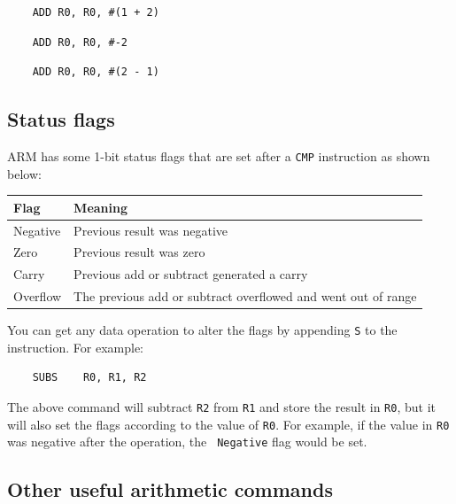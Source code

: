 \begin{verbatim}
	ADD	R0, R0, #(1 + 2)
\end{verbatim}

\begin{verbatim}
	ADD	R0, R0, #-2
\end{verbatim}

\begin{verbatim}
	ADD	R0, R0, #(2 - 1)
\end{verbatim}


\subsection{Status flags}

ARM has some 1-bit status flags that are set after a {\tt CMP} instruction as
shown below:

\begin{tabularx}{0.8\textwidth}{l|X}
	Flag & Meaning\\ \hline

	Negative & Previous result was negative\\ \hline

	Zero & Previous result was zero\\ \hline

	Carry & Previous add or subtract generated a carry\\ \hline

	Overflow & The previous add or subtract overflowed and went out of range\\
	\hline
\end{tabularx}

You can get any data operation to alter the flags by appending {\tt S} to the
instruction. For example:

\begin{verbatim}
	SUBS	R0, R1, R2
\end{verbatim}

The above command will subtract {\tt R2} from {\tt R1} and store the result in
{\tt R0}, but it will also set the flags according to the value of {\tt R0}. For
example, if the value in {\tt R0} was negative after the operation, the {\tt
Negative} flag would be set.

\subsection{Other useful arithmetic commands}

